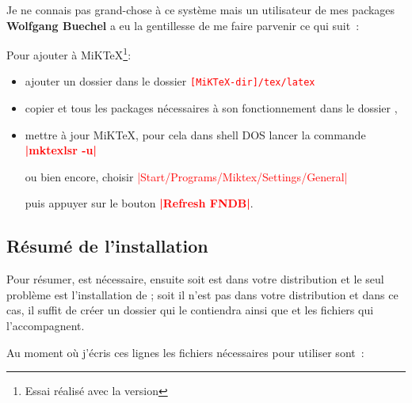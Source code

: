 Je ne connais pas grand-chose à ce système mais un utilisateur de mes packages \textbf{Wolfgang Buechel} a eu la gentillesse de me faire parvenir ce qui suit~:

Pour ajouter  à MiKTeX\footnote{Essai réalisé avec la version }:

\begin{itemize}\setlength{\itemsep}{10pt}
  \item ajouter un dossier  dans le dossier
       \textcolor{red}{\texttt{[MiKTeX-dir]/tex/latex}}
  \item copier  et tous les packages nécessaires à son fonctionnement  dans le dossier ,
  \item mettre à jour  MiKTeX, pour cela dans shell DOS lancer la commande   \textbf{\textcolor{red}{|mktexlsr -u|}}

   ou bien encore, choisir \textcolor{red}{|Start/Programs/Miktex/Settings/General|}

    puis appuyer sur le bouton  \textbf{\textcolor{red}{|Refresh FNDB|}}.
\end{itemize}

\subsection{Résumé de l'installation}

Pour résumer,   est nécessaire,  ensuite soit  est dans votre distribution et le seul problème est l'installation de ; soit il n'est pas dans votre distribution et dans ce cas, il suffit de créer un dossier qui le contiendra ainsi que  et les fichiers qui l'accompagnent.

Au moment où j'écris ces lignes les fichiers nécessaires pour utiliser  sont~:

